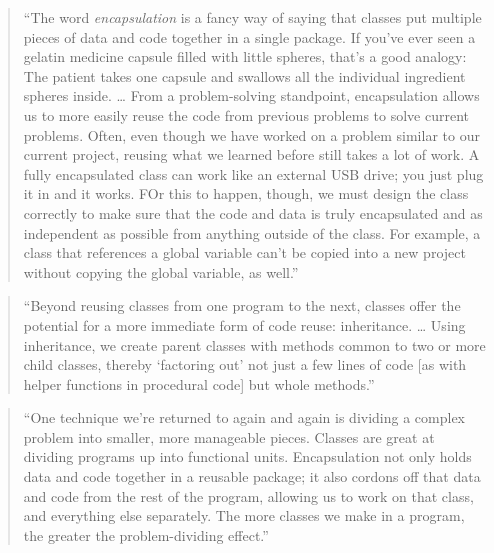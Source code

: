 \documentclass[]{tufte-book}
\begin{document}
\begin{quote}
``The word \emph{encapsulation} is a fancy way of saying that classes put multiple pieces of
data and code together in a single package. If you've ever seen a gelatin medicine capsule
filled with little spheres, that's a good analogy: The patient takes one capsule and swallows
all the individual ingredient spheres inside. \ldots{} From a problem-solving standpoint,
encapsulation allows us to more easily reuse the code from previous problems to solve current
problems. Often, even though we have worked on a problem similar to our current project,
reusing what we learned before still takes a lot of work. A fully encapsulated class can
work like an external USB drive; you just plug it in and it works. FOr this to happen,
though, we must design the class correctly to make sure that the code and data is truly
encapsulated and as independent as possible from anything outside of the class. For example,
a class that references a global variable can't be copied into a new project without
copying the global variable, as well.'' \citep{spraul2012think}
\end{quote}

\begin{quote}
``Beyond reusing classes from one program to the next, classes offer the potential for
a more immediate form of code reuse: inheritance. \ldots{} Using inheritance, we create parent
classes with methods common to two or more child classes, thereby `factoring out' not
just a few lines of code {[}as with helper functions in procedural code{]} but whole methods.''
\citep{spraul2012think}
\end{quote}

\begin{quote}
``One technique we're returned to again and again is dividing a complex problem into
smaller, more manageable pieces. Classes are great at dividing programs up into functional
units. Encapsulation not only holds data and code together in a reusable package; it also
cordons off that data and code from the rest of the program, allowing us to work on that
class, and everything else separately. The more classes we make in a program, the greater
the problem-dividing effect.'' \citep{spraul2012think}
\end{quote}
\end{document}
